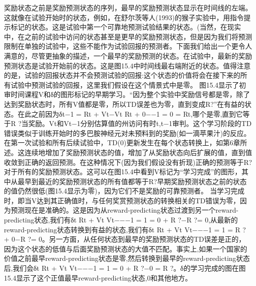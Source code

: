 奖励状态之前是奖励预测状态的序列，最早的奖励预测状态显示在时间线的左端。这就像在试验开始时的状态，例如，在舒尔茨等人(1993)的猴子实验中，用指令提示标记的状态。这是试验中第一个可靠地预测试验结果的状态。(当然，在现实中，在之前的试验中访问的状态甚至是更早的奖励预测状态，但是因为我们将预测限制在单独的试验中，这些不能作为试验回报的预测者。下面我们给出一个更令人满意的，尽管更抽象的描述，一个最早的奖励预测的状态。在试验中，最新的奖励预测状态是试验开始前的状态。这是图15.4中时间线最右端附近的状态。值得注意的是，试验的回报状态并不会预测试验的回报:这个状态的价值将会在接下来的所有试验中预测试验的回报，这里我们假设在这个情景式中是零。
图15.4显示了初审时间课程V和δ的图形标记的早期学习。“因为整个实验中奖励信号都是零，除了达到奖励状态时，所有V值都是零，所以TD误差也为零，直到变成R?”在有益的状态。在此之前因为δt−1 = Rt + Vt−Vt Rt + 0−−1 = 0 = Rt,哪个是零,直到它等于R ?当奖励。Vt和Vt−1分别估算值的州访问有时t,t−1审判。这个学习阶段的TD错误类似于训练开始时的多巴胺神经元对未预料到的奖励(如一滴苹果汁)的反应。
在第一次试验和所有后续试验中，TD(0)更新发生在每个状态转换上，如第6章所述。这连续地增加了奖励预测状态的值，增加了从奖励状态向后扩展的值，直到值收敛到正确的返回预测。在这种情况下(因为我们假设没有折现)正确的预测等于R?对于所有的奖励预测状态。这可以在图15.4中看到V标记为“学习完成”的图形，其中从最早到最近的奖励预测状态的所有值都等于R?早期奖励预测状态之前的状态的值仍然很低(图15.4显示为零)，因为它们不是奖励的可靠预测者。
当学习完成时，即当V达到其正确值时，与任何奖赏预测状态的转换相关的TD错误为零，因为预测现在是准确的。这是因为从reward-predicting状态过渡到另一个reward-predicting状态,我们有δt Rt + Vt Vt−−−1 = 1 = 0 + R ?−R ?= 0,从最新的reward-predicting状态转换到有益的状态,我们有δt Rt + Vt Vt−−−1 = 1 = R ? + 0−R ?= 0。另一方面，从任何状态到最早的奖励预测状态的TD误差是正的，因为这个状态的低值与后面奖励预测状态的大值不匹配。事实上,如果一个国家的价值之前最早reward-predicting状态是零,然后转换到最早的reward-predicting状态后,我们会δt Rt + Vt Vt−−−1 = 1 = 0 + R ?−0 = R ?。δ的学习完成的图在图15.4显示了这个正值最早reward-predicting状态,0和其他地方。


